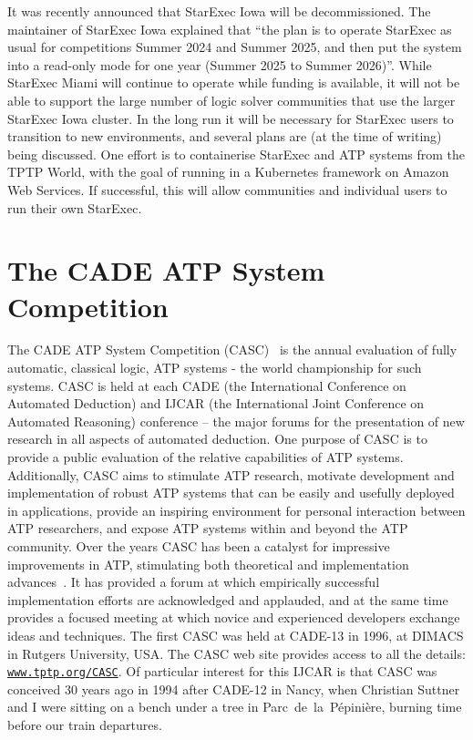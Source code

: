 \documentclass{easychair}
\begin{document}
It was recently announced that StarExec Iowa will be decommissioned. 
The maintainer of StarExec Iowa explained that ``the plan is to operate StarExec as usual for 
competitions Summer 2024 and Summer 2025, and then put the system into a read-only mode for one 
year (Summer 2025 to Summer 2026)''.
While StarExec Miami will continue to operate while funding is available, it will not be able
to support the large number of logic solver communities that use the larger StarExec Iowa cluster.
In the long run it will be necessary for StarExec users to transition to new environments,
and several plans are (at the time of writing) being discussed.
One effort is to containerise StarExec and ATP systems from the TPTP World, with the goal of
running in a Kubernetes framework on Amazon Web Services.
If successful, this will allow communities and individual users to run their own StarExec.

\section{The CADE ATP System Competition}
\label{CASC}

The CADE ATP System Competition (CASC)~\cite{Sut16} is the annual evaluation of fully automatic,
classical logic, ATP systems - the world championship for such systems.
CASC is held at each CADE (the International Conference on Automated Deduction) and IJCAR
(the International Joint Conference on Automated Reasoning) conference -- the major forums
for the presentation of new research in all aspects of automated deduction.
One purpose of CASC is to provide a public evaluation of the relative capabilities of ATP systems.
Additionally, CASC aims to
stimulate ATP research,
motivate development and implementation of robust ATP systems that can be easily and usefully
deployed in applications,
provide an inspiring environment for personal interaction between ATP researchers,
and
expose ATP systems within and beyond the ATP community.
Over the years CASC has been a catalyst for impressive improvements in ATP, stimulating both 
theoretical and implementation advances~\cite{Nie02-Paper}.
It has provided a forum at which empirically successful implementation efforts are acknowledged 
and applauded, and at the same time provides a focused meeting at which novice and experienced 
developers exchange ideas and techniques. 
The first CASC was held at CADE-13 in 1996, at DIMACS in Rutgers University, USA.
The CASC web site provides access to all the details:
\href{http://www.tptp.org/CASC/}{{\tt www.tptp.org/CASC}}.
Of particular interest for this IJCAR is that CASC was conceived 30 years ago in 1994 after 
CADE-12 in Nancy, when Christian Suttner and I were sitting on a bench under a tree in 
Parc~de~la~Pépinière, burning time before our train departures.
\end{document}
